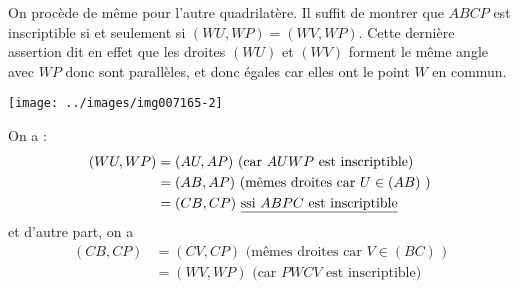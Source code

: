 {\begin{enumerate}
{On procède de même pour l'autre quadrilatère.
Il suffit de montrer que $ABCP$ est inscriptible si et seulement si $(WU,WP)=(WV,WP)$. 
Cette dernière assertion dit en effet que les droites $(WU)$ et $(WV)$ forment le même angle avec $WP$ donc sont parallèles, et donc égales car elles ont le point $W$ en commun.

\begin{center}
\texttt{[image: ../images/img007165-2]}
\end{center}
On a :
\begin{align*}
(WU,WP)
&= (AU,AP) \text{ (car $AUWP$ est inscriptible)}\\
&= (AB,AP) \text{ (mêmes droites car $U\in (AB)$ )}\\
&= (CB,CP) \text{ \underline{ssi $ABPC$ est inscriptible}}
\end{align*}
et d'autre part, on a 
\begin{align*}
(CB,CP)
&= (CV,CP) \text{ (mêmes droites car $V\in (BC)$ )}\\
&= (WV,WP) \text{ (car $PWCV$ est inscriptible)}
\end{align*}
}
\end{enumerate}
}
